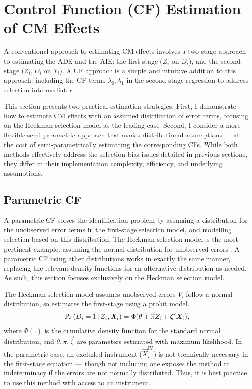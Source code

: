 \section{Control Function (CF) Estimation of CM Effects}
\label{sec:controlfun}
A conventional approach to estimating CM effects involves a two-stage approach to estimating the ADE and the AIE: the first-stage ($Z_i$ on $D_i$), and the second-stage ($Z_i, D_i$ on $Y_i$).
A CF approach is a simple and intuitive addition to this approach: including the CF terms $\lambda_0, \lambda_1$ in the second-stage regression to address selection-into-mediator.

This section presents two practical estimation strategies.
First, I demonstrate how to estimate CM effects with an assumed distribution of error terms, focusing on the Heckman selection model as the leading case.
Second, I consider a more flexible semi-parametric approach that avoids distributional assumptions --- at the cost of semi-parametrically estimating the corresponding CFs.
While both methods effectively address the selection bias issues detailed in previous sections, they differ in their implementation complexity, efficiency, and underlying assumptions.

\subsection{Parametric CF}
A parametric CF solves the identification problem by assuming a distribution for the unobserved error terms in the first-stage selection model, and modelling selection based on this distribution.
The Heckman selection model is the most pertinent example, assuming the normal distribution for unobserved errors \citep{heckman1979sample}.
A parametric CF using other distributions works in exactly the same manner, replacing the relevant density functions for an alternative distribution as needed.
As such, this section focuses exclusively on the Heckman selection model.

The Heckman selection model assumes unobserved errors $V_i$ follow a normal distribution, so estimates the first-stage using a probit model.
\[ \Pr\left( D_i = 1 \, \middle\vert \, Z_i, \boldsymbol{\mathit{X}}_i \right)
    = \Phi \big( \theta + \overline{\pi} Z_i + \boldsymbol{\mathit{\zeta}}' \boldsymbol{\mathit{X}}_i \big), \]
where $\Phi(.)$ is the cumulative density function for the standard normal distribution, and $\theta, \bar\pi, \vec\zeta$ are parameters estimated with maximum likelihood.
In the parametric case, an excluded instrument ($\vec X_i^{\text{IV}}$) is not technically necessary in the first-stage equation --- though not including one exposes the method to indeterminacy if the errors are not normally distributed.
Thus, it is best practice to use this method with access to an instrument.

